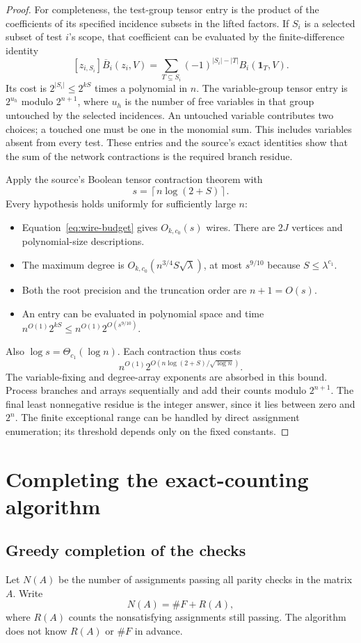 \documentclass[11pt]{article}
\theoremstyle{remark}
\newcommand{\ceil}[1]{\left\lceil #1\right\rceil}
\begin{document}
\begin{proof}
For completeness, the test-group tensor entry is the product of the
coefficients of its specified incidence subsets in the lifted factors.
If \(S_i\) is a selected subset of test \(i\)'s scope, that coefficient
can be evaluated by the finite-difference identity
\[
 [z_{i,S_i}]\overline B_i(z_i,V)
  =\sum_{T\subseteq S_i}(-1)^{|S_i|-|T|}
                     B_i(\mathbf1_T,V).
\]
Its cost is \(2^{|S_i|}\le2^{kS}\) times a polynomial in \(n\).
The variable-group tensor entry is \(2^{u_h}\) modulo \(2^{n+1}\),
where \(u_h\) is the number of free variables in that group untouched
by the selected incidences. An untouched variable contributes two
choices; a touched one must be one in the monomial sum.
This includes variables absent from every test.
These entries and the source's exact identities show that the sum
of the network contractions is the required branch residue.

Apply the source's Boolean tensor contraction theorem with
\[
 s=\ceil{n\log(2+S)}.
\]
Every hypothesis holds uniformly for sufficiently large \(n\):
\begin{itemize}
\item Equation~\eqref{eq:wire-budget} gives \(O_{k,c_0}(s)\) wires.
There are \(2J\) vertices and polynomial-size descriptions.
\item The maximum degree is
\(O_{k,c_0}(n^{3/4}S\sqrt\lambda)\), at most \(s^{9/10}\)
because \(S\le\lambda^{c_1}\).
\item Both the root precision and the truncation order are \(n+1=O(s)\).
\item An entry can be evaluated in polynomial space and time
\(n^{O(1)}2^{kS}\le n^{O(1)}2^{O(s^{9/10})}\).
\end{itemize}
Also \(\log s=\Theta_{c_1}(\log n)\). Each contraction thus costs
\[
 n^{O(1)}2^{O(n\log(2+S)/\sqrt{\log n})}.
\]
The variable-fixing and degree-array exponents are absorbed in this
bound. Process branches and arrays sequentially and add their counts
modulo \(2^{n+1}\). The final least nonnegative residue is the integer
answer, since it lies between zero and \(2^n\).
The finite exceptional range can be handled by direct assignment
enumeration; its threshold depends only on the fixed constants.
\end{proof}

\section{Completing the exact-counting algorithm}\label{sec:algorithm}
\subsection{Greedy completion of the checks}
Let \(N(A)\) be the number of assignments passing all parity checks
in the matrix \(A\). Write
\[
 N(A)=\#F+R(A),
\]
where \(R(A)\) counts the nonsatisfying assignments still passing.
The algorithm does not know \(R(A)\) or \(\#F\) in advance.
\end{document}
